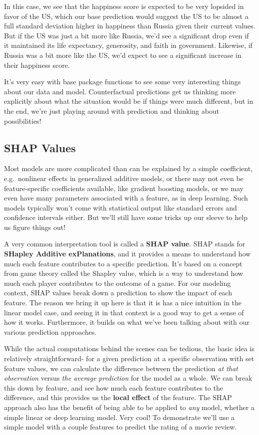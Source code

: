 \documentclass[
  letterpaper,
]{krantz}
\begin{document}
In this case, we see that the happiness score is expected to be very
lopsided in favor of the US, which our base prediction would suggest the
US to be almost a full standard deviation higher in happiness than
Russia given their current values. But if the US was just a bit more
like Russia, we'd see a significant drop even if it maintained its life
expectancy, generosity, and faith in government. Likewise, if Russia was
a bit more like the US, we'd expect to see a significant increase in
their happiness score.

It's very easy with base package functions to see some very interesting
things about our data and model. Counterfactual predictions get us
thinking more explicitly about what the situation would be if things
were much different, but in the end, we're just playing around with
prediction and thinking about possibilities!

\subsection{SHAP Values}\label{sec-knowing-shap-values}

Most models are more complicated than can be explained by a simple
coefficient, e.g.~nonlinear effects in generalized additive models, or
there may not even be feature-specific coefficients available, like
gradient boosting models, or we may even have many parameters associated
with a feature, as in deep learning. Such models typically won't come
with statistical output like standard errors and confidence intervals
either. But we'll still have some tricks up our sleeve to help us figure
things out!

A very common interpretation tool is called a \textbf{SHAP value}. SHAP
stands for \textbf{SHapley Additive exPlanations}, and it provides a
means to understand how much each feature contributes to a specific
prediction. It's based on a concept from game theory called the Shapley
value, which is a way to understand how much each player contributes to
the outcome of a game. For our modeling context, SHAP values break down
a prediction to show the impact of each feature. The reason we bring it
up here is that it is has a nice intuition in the linear model case, and
seeing it in that context is a good way to get a sense of how it works.
Furthermore, it builds on what we've been talking about with our various
prediction approaches.

While the actual computations behind the scenes can be tedious, the
basic idea is relatively straightforward- for a given prediction at a
specific observation with set feature values, we can calculate the
difference between the prediction \emph{at that observation} versus
\emph{the average prediction} for the model as a whole. We can break
this down by feature, and see how much each feature contributes to the
difference, and this provides us the \textbf{local effect} of the
feature. The SHAP approach also has the benefit of being able to be
applied to \emph{any} model, whether a simple linear or deep learning
model. Very cool! To demonstrate we'll use a simple model with a couple
features to predict the rating of a movie review.
\end{document}
